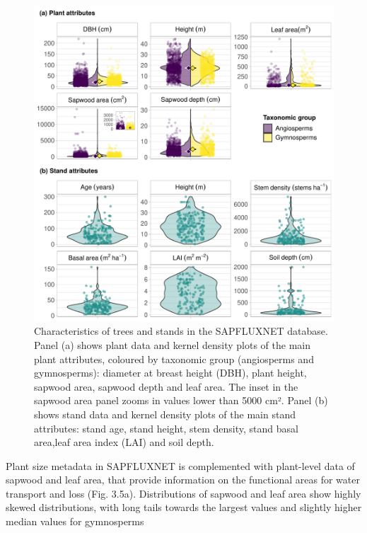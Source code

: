 \documentclass[11pt,twoside]{reedthesis}
\begin{document}
\setlength{\abovecaptionskip}{0pt}
\begin{figure}[hbt!]

{\centering \includegraphics[width=1\linewidth]{figure/CH3/Figure5} 

}

\caption[Characteristics of trees and stands in the SAPFLUXNET database.]{Characteristics of trees and stands in the SAPFLUXNET database. Panel (a) shows plant data and kernel density plots of the main plant attributes, coloured by taxonomic group (angiosperms and gymnosperms): diameter at breast height (DBH), plant height, sapwood area, sapwood depth and leaf area. The inset in the sapwood area panel zooms in values lower than 5000 cm². Panel (b) shows stand data and kernel density plots of the main stand attributes: stand age, stand height, stem density, stand basal area,leaf area index (LAI) and soil depth.}\label{fig:Ch2plot5}
\end{figure}
Plant size metadata in SAPFLUXNET is complemented with plant-level data
of sapwood and leaf area, that provide information on the functional
areas for water transport and loss (Fig. 3.5a). Distributions of sapwood
and leaf area show highly skewed distributions, with long tails towards
the largest values and slightly higher median values for gymnosperms
\end{document}

